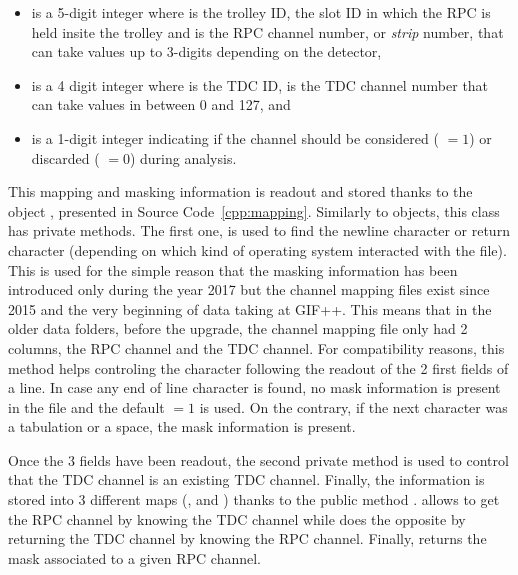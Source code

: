 	\begin{itemize}
		\item[\textinline{TSCCC}] is a 5-digit integer where  is the trolley ID,  the slot ID in which the RPC is held insite the trolley  and  is the RPC channel number, or \textit{strip} number, that can take values up to 3-digits depending on the detector,
		\item[\textinline{TCCC}] is a 4 digit integer where  is the TDC ID,  is the TDC channel number that can take values in between 0 and 127, and
		\item[\textinline{M}] is a 1-digit integer indicating if the channel should be considered ( $=1$) or discarded ( $=0$) during analysis.
	\end{itemize}
	
	This mapping and masking information is readout and stored thanks to the object , presented in Source Code~\ref{cpp:mapping}. Similarly to  objects, this class has private methods. The first one,  is used to find the newline character  or return character  (depending on which kind of operating system interacted with the file). This is used for the simple reason that the masking information has been introduced only during the year 2017 but the channel mapping files exist since 2015 and the very beginning of data taking at GIF++. This means that in the older data folders, before the upgrade, the channel mapping file only had 2 columns, the RPC channel and the TDC channel. For compatibility reasons, this method helps controling the character following the readout of the 2 first fields of a line. In case any end of line character is found, no mask information is present in the file and the default  $=1$ is used. On the contrary, if the next character was a tabulation or a space, the mask information is present.
	
	Once the 3 fields have been readout, the second private method  is used to control that the TDC channel is an existing TDC channel. Finally, the information is stored into 3 different maps (,  and ) thanks to the public method .  allows to get the RPC channel by knowing the TDC channel while  does the opposite by returning the TDC channel by knowing the RPC channel. Finally,  returns the mask associated to a given RPC channel.\\
	
